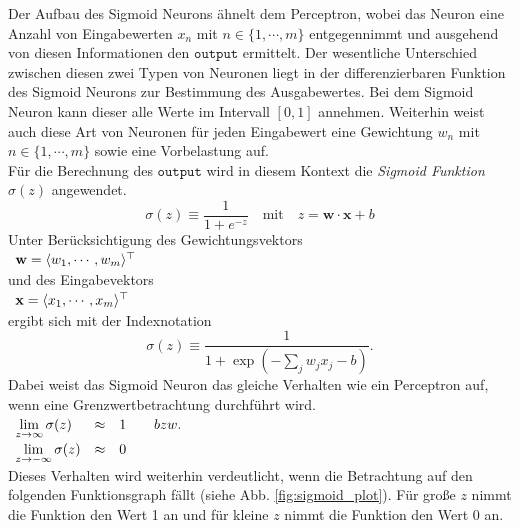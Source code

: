 \noindent
Der Aufbau des Sigmoid Neurons ähnelt dem Perceptron, wobei das Neuron eine Anzahl von Eingabewerten $x_n$ mit $n \in \{1, \cdots ,m\}$ entgegennimmt und ausgehend von diesen Informationen den $\mathtt{output}$ ermittelt. Der wesentliche Unterschied zwischen diesen zwei Typen von Neuronen liegt in der differenzierbaren Funktion des Sigmoid Neurons zur Bestimmung des Ausgabewertes. Bei dem Sigmoid Neuron kann dieser alle Werte im Intervall $[0,1]$ annehmen. Weiterhin weist auch diese Art von Neuronen für jeden Eingabewert eine Gewichtung $w_n$ mit $n \in \{1, \cdots ,m\}$ sowie eine Vorbelastung auf. \\
Für die Berechnung des $\mathtt{output}$ wird in diesem Kontext die \textit{Sigmoid Funktion} $\sigma(z)$ angewendet.
\begin{equation}
	\sigma(z) \equiv \frac{1}{1+e^{-z}} \quad\mbox{mit}\quad z = \mathbf{w} \cdot \mathbf{x} + b
\end{equation}
Unter Berücksichtigung des Gewichtungsvektors \\[0.2cm]
\hspace*{1.3cm}
$
\begin{array}[t]{lclll}
	\mathbf{w} = \langle w_1, \cdots, w_m \rangle^\top
\end{array}
$
\\[0.2cm]
und des Eingabevektors \\[0.2cm]
\hspace*{1.3cm}
$
\begin{array}[t]{lclll}
	\mathbf{x} = \langle x_1, \cdots, x_m \rangle^\top
\end{array}
$
\\[0.2cm]
ergibt sich mit der Indexnotation 
\begin{equation}
	\sigma(z) \equiv \frac{1}{1+\exp(-\sum_j w_j x_j - b)}.
\end{equation}
Dabei weist das Sigmoid Neuron das gleiche Verhalten wie ein Perceptron auf, wenn eine Grenzwertbetrachtung durchführt wird. \\[0.2cm]
\hspace*{1.3cm}
$
\begin{array}[t]{lcll}
	\lim\limits_{z \to \infty}{\sigma(z)} & \approx & 1 \quad\quad bzw. \\[0.2cm]
	\lim\limits_{z \to -\infty}{ \sigma(z)} & \approx & 0
\end{array}
$
\\[0.2cm]
Dieses Verhalten wird weiterhin verdeutlicht, wenn die Betrachtung auf den folgenden Funktionsgraph fällt (siehe Abb. \ref{fig:sigmoid_plot}). Für große $z$ nimmt die Funktion den Wert 1 an und für kleine $z$ nimmt die Funktion den Wert 0 an.
